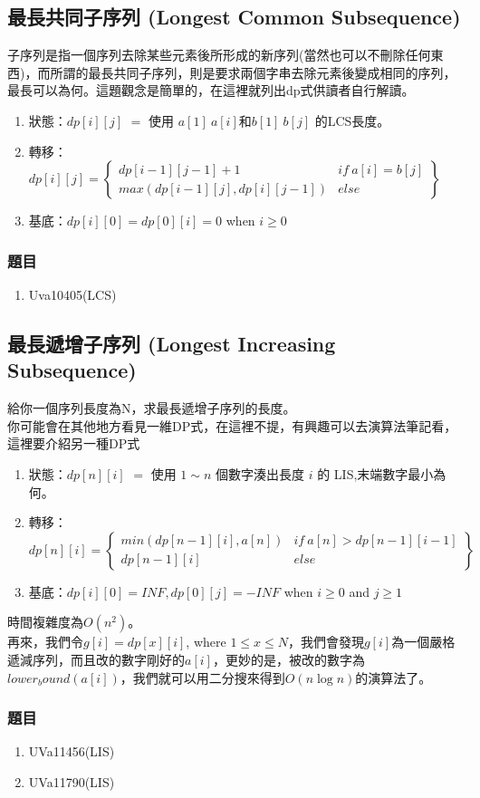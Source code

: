 \subsection{最長共同子序列 (Longest Common Subsequence)}
子序列是指一個序列去除某些元素後所形成的新序列(當然也可以不刪除任何東西)，而所謂的最長共同子序列，則是要求兩個字串去除元素後變成相同的序列，最長可以為何。這題觀念是簡單的，在這裡就列出dp式供讀者自行解讀。
\begin{enumerate}
\item 狀態：$dp[i][j]$ $=$ 使用 $a[1]~a[i]$和$b[1]~b[j]$ 的LCS長度。
\item 轉移：$dp[i][j] =\left\{ \begin{array}{cc}
dp[i-1][j-1]+1 & if\ a[i]=b[j]\\
max(dp[i-1][j],dp[i][j-1]) & else
\end{array} \right\}$
\item 基底：$dp[i][0]=dp[0][i]=0$ when $i \geq 0$
\end{enumerate}
\subsubsection{題目}
\begin{enumerate}
\item Uva10405(LCS)
\end{enumerate}
\subsection{最長遞增子序列 (Longest Increasing Subsequence)}
給你一個序列長度為N，求最長遞增子序列的長度。\\
你可能會在其他地方看見一維DP式，在這裡不提，有興趣可以去演算法筆記看，這裡要介紹另一種DP式
\begin{enumerate}
\item 狀態：$dp[n][i]$ $=$ 使用 $1 ∼ n$ 個數字湊出長度 $i$ 的 LIS,末端數字最小為何。
\item 轉移：$dp[n][i] =\left\{ \begin{array}{cc}
min(dp[n-1][i],a[n]) & if\ a[n]>dp[n-1][i-1]\\
dp[n-1][i] & else
\end{array} \right\}$
\item 基底：$dp[i][0] = INF, dp[0][j] = −INF$ when $i \geq 0$ and $j \geq 1$
\end{enumerate}
時間複雜度為$O(n^2)$。\\
再來，我們令$g[i]=dp[x][i]$, where $1\leq x \leq N$，我們會發現$g[i]$為一個嚴格遞減序列，而且改的數字剛好的$a[i]$，更妙的是，被改的數字為$lower_bound(a[i])$，我們就可以用二分搜來得到$O(n\log n)$的演算法了。

\subsubsection{題目}
\begin{enumerate}
\item UVa11456(LIS)
\item UVa11790(LIS)
\end{enumerate}